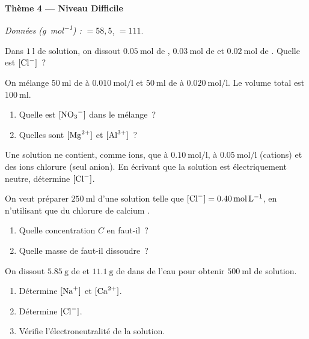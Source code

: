 \documentclass[11pt,a4paper]{article}
\begin{document}
\begin{center}{\large\bfseries\color{primarydark} Thème 4 — Niveau Difficile}\end{center}
\emph{Données (\si{\gram\per\mole}) :} $=58{,}5$, $=111$.

\begin{exo}
Dans $\SI{1}{\litre}$ de solution, on dissout $\SI{0.05}{\mole}$ de ,
$\SI{0.03}{\mole}$ de  et $\SI{0.02}{\mole}$ de . Quelle est $[\ce{Cl-}]$~?
\end{exo}

\begin{exo}
On mélange $\SI{50}{\milli\litre}$ de  à $\SI{0.010}{\mole\per\litre}$ et
$\SI{50}{\milli\litre}$ de  à $\SI{0.020}{\mole\per\litre}$. Le volume total est
$\SI{100}{\milli\litre}$.
\begin{enumerate}[label=\alph*)]
  \item Quelle est $[\ce{NO3-}]$ dans le mélange~?
  \item Quelles sont $[\ce{Mg^2+}]$ et $[\ce{Al^3+}]$~?
\end{enumerate}
\end{exo}

\begin{exo}[électroneutralité]
Une solution ne contient, comme ions, que  à $\SI{0.10}{\mole\per\litre}$,  à
$\SI{0.05}{\mole\per\litre}$ (cations) et des ions chlorure  (seul anion). En écrivant que la
solution est électriquement neutre, détermine $[\ce{Cl-}]$.
\end{exo}

\begin{exo}
On veut préparer $\SI{250}{\milli\litre}$ d'une solution telle que $[\ce{Cl-}] = \SI{0.40}{\mole\per\litre}$,
en n'utilisant que du chlorure de calcium .
\begin{enumerate}[label=\alph*)]
  \item Quelle concentration $C$ en  faut-il~?
  \item Quelle masse de  faut-il dissoudre~?
\end{enumerate}
\end{exo}

\begin{exo}
On dissout $\SI{5.85}{\gram}$ de  et $\SI{11.1}{\gram}$ de  dans de l'eau pour
obtenir $\SI{500}{\milli\litre}$ de solution.
\begin{enumerate}[label=\alph*)]
  \item Détermine $[\ce{Na+}]$ et $[\ce{Ca^2+}]$.
  \item Détermine $[\ce{Cl-}]$.
  \item Vérifie l'électroneutralité de la solution.
\end{enumerate}
\end{exo}
\end{document}
